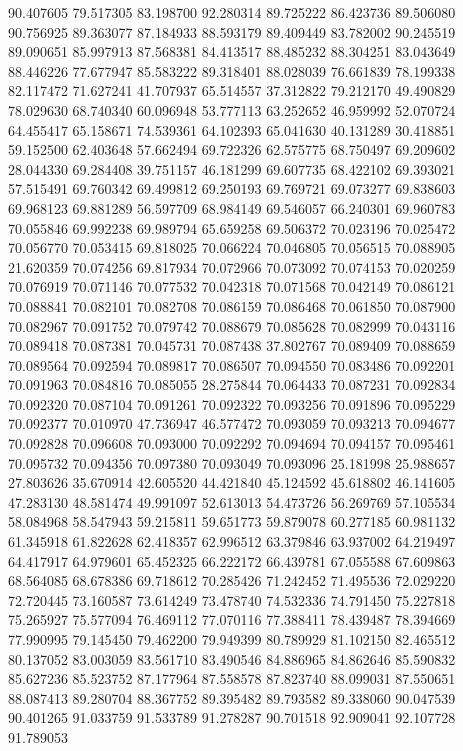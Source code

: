 90.407605
79.517305
83.198700
92.280314
89.725222
86.423736
89.506080
90.756925
89.363077
87.184933
88.593179
89.409449
83.782002
90.245519
89.090651
85.997913
87.568381
84.413517
88.485232
88.304251
83.043649
88.446226
77.677947
85.583222
89.318401
88.028039
76.661839
78.199338
82.117472
71.627241
41.707937
65.514557
37.312822
79.212170
49.490829
78.029630
68.740340
60.096948
53.777113
63.252652
46.959992
52.070724
64.455417
65.158671
74.539361
64.102393
65.041630
40.131289
30.418851
59.152500
62.403648
57.662494
69.722326
62.575775
68.750497
69.209602
28.044330
69.284408
39.751157
46.181299
69.607735
68.422102
69.393021
57.515491
69.760342
69.499812
69.250193
69.769721
69.073277
69.838603
69.968123
69.881289
56.597709
68.984149
69.546057
66.240301
69.960783
70.055846
69.992238
69.989794
65.659258
69.506372
70.023196
70.025472
70.056770
70.053415
69.818025
70.066224
70.046805
70.056515
70.088905
21.620359
70.074256
69.817934
70.072966
70.073092
70.074153
70.020259
70.076919
70.071146
70.077532
70.042318
70.071568
70.042149
70.086121
70.088841
70.082101
70.082708
70.086159
70.086468
70.061850
70.087900
70.082967
70.091752
70.079742
70.088679
70.085628
70.082999
70.043116
70.089418
70.087381
70.045731
70.087438
37.802767
70.089409
70.088659
70.089564
70.092594
70.089817
70.086507
70.094550
70.083486
70.092201
70.091963
70.084816
70.085055
28.275844
70.064433
70.087231
70.092834
70.092320
70.087104
70.091261
70.092322
70.093256
70.091896
70.095229
70.092377
70.010970
47.736947
46.577472
70.093059
70.093213
70.094677
70.092828
70.096608
70.093000
70.092292
70.094694
70.094157
70.095461
70.095732
70.094356
70.097380
70.093049
70.093096
25.181998
25.988657
27.803626
35.670914
42.605520
44.421840
45.124592
45.618802
46.141605
47.283130
48.581474
49.991097
52.613013
54.473726
56.269769
57.105534
58.084968
58.547943
59.215811
59.651773
59.879078
60.277185
60.981132
61.345918
61.822628
62.418357
62.996512
63.379846
63.937002
64.219497
64.417917
64.979601
65.452325
66.222172
66.439781
67.055588
67.609863
68.564085
68.678386
69.718612
70.285426
71.242452
71.495536
72.029220
72.720445
73.160587
73.614249
73.478740
74.532336
74.791450
75.227818
75.265927
75.577094
76.469112
77.070116
77.388411
78.439487
78.394669
77.990995
79.145450
79.462200
79.949399
80.789929
81.102150
82.465512
80.137052
83.003059
83.561710
83.490546
84.886965
84.862646
85.590832
85.627236
85.523752
87.177964
87.558578
87.823740
88.099031
87.550651
88.087413
89.280704
88.367752
89.395482
89.793582
89.338060
90.047539
90.401265
91.033759
91.533789
91.278287
90.701518
92.909041
92.107728
91.789053
